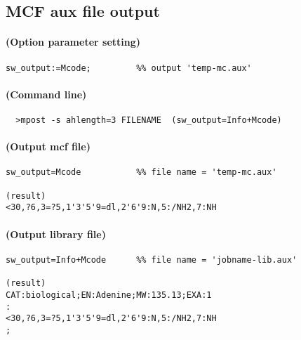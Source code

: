 \documentclass[a4paper]{article}
\begin{document}
\subsection{MCF aux file output}
\paragraph{(Option parameter setting)}
%
\begin{verbatim}
sw_output:=Mcode;         %% output 'temp-mc.aux'
\end{verbatim}
\paragraph{(Command line)}
\begin{verbatim}
  >mpost -s ahlength=3 FILENAME  (sw_output=Info+Mcode)
\end{verbatim}
\paragraph{(Output mcf file)}
\begin{verbatim}
sw_output=Mcode           %% file name = 'temp-mc.aux'

(result)
<30,?6,3=?5,1'3'5'9=dl,2'6'9:N,5:/NH2,7:NH

\end{verbatim}
\paragraph{(Output library file)}
\begin{verbatim}
sw_output=Info+Mcode      %% file name = 'jobname-lib.aux'

(result)
CAT:biological;EN:Adenine;MW:135.13;EXA:1
:
<30,?6,3=?5,1'3'5'9=dl,2'6'9:N,5:/NH2,7:NH
;

\end{verbatim}
\end{document}
